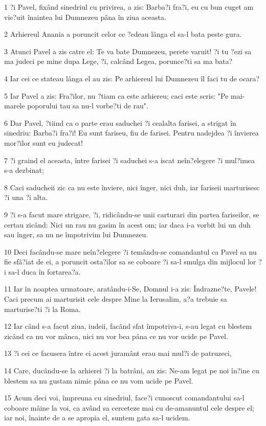\par 1 ?i Pavel, fixând sinedriul cu privirea, a zis: Barba?i fra?i, eu cu bun cuget am vie?uit înaintea lui Dumnezeu pâna în ziua aceasta.
\par 2 Arhiereul Anania a poruncit celor ce ?edeau lânga el sa-l bata peste gura.
\par 3 Atunci Pavel a zis catre el: Te va bate Dumnezeu, perete varuit! ?i tu ?ezi sa ma judeci pe mine dupa Lege, ?i, calcând Legea, porunce?ti sa ma bata?
\par 4 Iar cei ce stateau lânga el au zis: Pe arhiereul lui Dumnezeu îl faci tu de ocara?
\par 5 Iar Pavel a zis: Fra?ilor, nu ?tiam ca este arhiereu; caci este scris: "Pe mai-marele poporului tau sa nu-l vorbe?ti de rau".
\par 6 Dar Pavel, ?tiind ca o parte erau saduchei ?i cealalta farisei, a strigat în sinedriu: Barba?i fra?i! Eu sunt fariseu, fiu de farisei. Pentru nadejdea ?i învierea mor?ilor sunt eu judecat!
\par 7 ?i graind el aceasta, între farisei ?i saduchei s-a iscat neîn?elegere ?i mul?imea s-a dezbinat;
\par 8 Caci saducheii zic ca nu este înviere, nici înger, nici duh, iar fariseii marturisesc ?i una ?i alta.
\par 9 ?i s-a facut mare strigare, ?i, ridicându-se unii carturari din partea fariseilor, se certau zicând: Nici un rau nu gasim în acest om; iar daca i-a vorbit lui un duh sau înger, sa nu ne împotrivim lui Dumnezeu.
\par 10 Deci facându-se mare neîn?elegere ?i temându-se comandantul ca Pavel sa nu fie sfâ?iat de ei, a poruncit osta?ilor sa se coboare ?i sa-l smulga din mijlocul lor ?i sa-l duca în fortarea?a.
\par 11 Iar în noaptea urmatoare, aratându-i-Se, Domnul i-a zis: Îndrazne?te, Pavele! Caci precum ai marturisit cele despre Mine la Ierusalim, a?a trebuie sa marturise?ti ?i la Roma.
\par 12 Iar când s-a facut ziua, iudeii, facând sfat împotriva-i, s-au legat cu blestem zicând ca nu vor mânca, nici nu vor bea pâna ce nu vor ucide pe Pavel.
\par 13 ?i cei ce facusera între ei acest juramânt erau mai mul?i de patruzeci,
\par 14 Care, ducându-se la arhierei ?i la batrâni, au zis: Ne-am legat pe noi în?ine cu blestem sa nu gustam nimic pâna ce nu vom ucide pe Pavel.
\par 15 Acum deci voi, împreuna cu sinedriul, face?i cunoscut comandantului sa-l coboare mâine la voi, ca având sa cerceteze mai cu de-amanuntul cele despre el; iar noi, înainte de a se apropia el, suntem gata sa-l ucidem.
